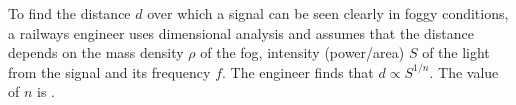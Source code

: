 

    \item To find the distance $d$ over which a signal can be seen clearly in foggy conditions, a railways engineer uses dimensional analysis and assumes that the distance depends on the mass density $\rho$ of the fog, intensity (power/area) $S$ of the light from the signal and its frequency $f$. The engineer finds that $d \propto S^{1/n}$. The value of $n$ is \underline{\hspace{2.5 cm}}.

